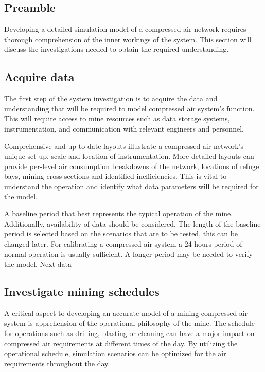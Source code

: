 	\subsection{Preamble}
		Developing a detailed simulation model of a compressed air network requires thorough comprehension of the inner workings of the system. This section will discuss the investigations needed to obtain the required understanding.
	\subsection{Acquire data} %
	The first step of the system investigation is to acquire the data and understanding that will be required to model compressed air system's function. This will require access to mine resources such as data storage systems, instrumentation, and communication with relevant engineers and personnel.
	\par 
	Comprehensive and up to date layouts illustrate a compressed air network's unique set-up, scale and location of instrumentation. More detailed layouts can provide per-level air consumption breakdowns of the network, locations of refuge bays, mining cross-sections and identified inefficiencies. This is vital to understand the operation and identify what data parameters will be required for the model. 
	\par 
	A baseline period that best represents the typical operation of the mine. Additionally, availability of data should be considered. The length of the baseline period is selected based on the scenarios that are to be tested, this can be changed later. For calibrating a compressed air system a 24 hours period of normal operation is usually sufficient. A longer period may be needed to verify the model.
	Next data 
	\subsection{Investigate mining schedules}
	A critical aspect to developing an accurate model of a mining compressed air system is apprehension of the operational philosophy of the mine. The schedule for operations such as drilling,  blasting or cleaning can have a major impact on compressed air requirements at different times of the day. By utilizing the operational schedule, simulation scenarios can be optimized for the air requirements throughout the day.	
	
